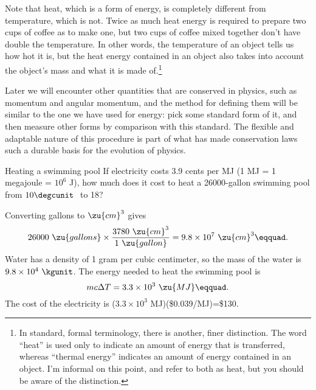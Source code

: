 Note that heat, which is a form of energy, is completely
different from temperature, which is not. Twice as much heat
energy is required to prepare two cups of coffee as to make
one, but two cups of coffee mixed together don't have double
the temperature. In other words, the temperature of an
object tells us how hot it is, but the heat energy contained
in an object also takes into account the object's mass
and what it is made of.\footnote{In standard, formal terminology, there
is another, finer distinction. The word ``heat'' is used only
to indicate an amount of energy that is transferred,
whereas ``thermal energy'' indicates an amount of energy
contained in an object. I'm informal on this point, and
refer to both as heat, but you should be aware of the
distinction.}

Later we will encounter other quantities that are conserved
in physics, such as momentum and angular momentum, and the
method for defining them will be similar to the one we have
used for energy: pick some standard form of it, and then
measure other forms by comparison with this standard. The
flexible and adaptable nature of this procedure is part of
what has made conservation laws such a durable basis for the
evolution of physics.

\begin{eg}{Heating a swimming pool}
\egquestion If electricity costs 3.9 cents per MJ (1 MJ = 1
megajoule = $10^6$ J), how much does it cost to heat a
26000-gallon swimming pool from $10\degcunit\ $ to 18\degcunit?

\eganswer Converting gallons to $\zu{cm}^3$ gives
\begin{equation*}
        26000\ \zu{gallons} \times \frac{3780\ \zu{cm}^3}{1\ \zu{gallon}}
            =  9.8\times10^7\ \zu{cm}^3\eqquad.
\end{equation*}
Water has a density of 1 gram per cubic centimeter, so the
mass of the water is $9.8\times10^4\ \kgunit$. The energy needed
to heat the swimming pool is
\begin{equation*}
  mc\Delta T= 3.3\times10^3\ \zu{MJ}\eqquad.
\end{equation*}
The cost of the electricity is ($3.3\times10^3$ MJ)(\$0.039/MJ)=\$130.
\end{eg}


